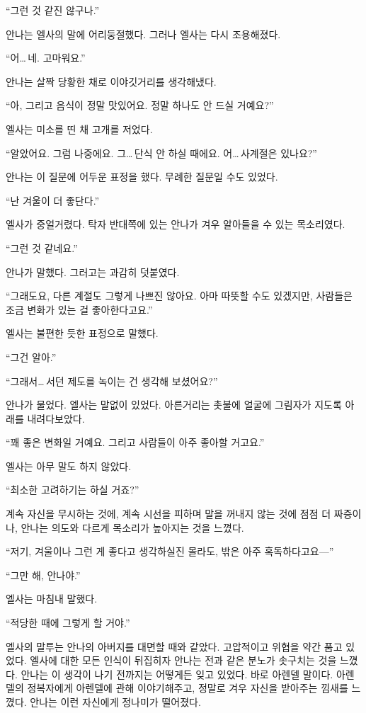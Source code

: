 ``그런 것 같진 않구나.''

안나는 엘사의 말에 어리둥절했다. 그러나 엘사는 다시 조용해졌다.

``어\ldots\,네. 고마워요.''

안나는 살짝 당황한 채로 이야깃거리를 생각해냈다.

``아, 그리고 음식이 정말 맛있어요. 정말 하나도 안 드실 거예요?''

엘사는 미소를 띤 채 고개를 저었다.

``알았어요. 그럼 나중에요. 그\ldots\,단식 안 하실 때에요. 어\ldots\,사계절은 있나요?''

안나는 이 질문에 어두운 표정을 했다. 무례한 질문일 수도 있었다.

``난 겨울이 더 좋단다.''

엘사가 중얼거렸다. 탁자 반대쪽에 있는 안나가 겨우 알아들을 수 있는 목소리였다.

``그런 것 같네요.''

안나가 말했다. 그러고는 과감히 덧붙였다.

``그래도요, 다른 계절도 그렇게 나쁘진 않아요. 아마 따뜻할 수도 있겠지만, 사람들은 조금 변화가 있는 걸 좋아한다고요.''

엘사는 불편한 듯한 표정으로 말했다.

``그건 알아.''

``그래서\ldots\,서던 제도를 녹이는 건 생각해 보셨어요?''

안나가 물었다. 엘사는 말없이 있었다. 아른거리는 촛불에 얼굴에 그림자가 지도록 아래를 내려다보았다.

``꽤 좋은 변화일 거예요. 그리고 사람들이 아주 좋아할 거고요.''

엘사는 아무 말도 하지 않았다.

``최소한 고려하기는 하실 거죠?''

계속 자신을 무시하는 것에, 계속 시선을 피하며 말을 꺼내지 않는 것에 점점 더 짜증이 나, 안나는 의도와 다르게 목소리가 높아지는 것을 느꼈다.

``저기, 겨울이나 그런 게 좋다고 생각하실진 몰라도, 밖은 아주 혹독하다고요—''

``그만 해, 안나야.''

엘사는 마침내 말했다.

``적당한 때에 그렇게 할 거야.''

엘사의 말투는 안나의 아버지를 대면할 때와 같았다. 고압적이고 위협을 약간 품고 있었다. 엘사에 대한 모든 인식이 뒤집히자 안나는 전과 같은 분노가 솟구치는 것을 느꼈다. 안나는 이 생각이 나기 전까지는 어떻게든 잊고 있었다. 바로 아렌델 말이다. 아렌델의 정복자에게 아렌델에 관해 이야기해주고, 정말로 겨우 자신을 받아주는 낌새를 느꼈다. 안나는 이런 자신에게 정나미가 떨어졌다.

